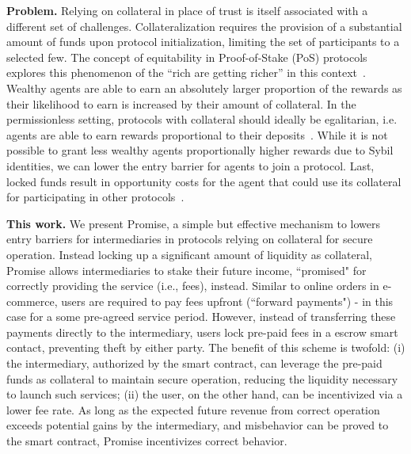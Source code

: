 \documentclass[runningheads]{llncs}
\newcommand{\sys}{Promise\xspace}
\newcommand{\aza}[1]{\todo[linecolor=blue,backgroundcolor=blue!25,bordercolor=blue,inline,caption={}]{Comment by Alexei: #1}}
\begin{document}
\noindent\textbf{Problem.}
Relying on collateral in place of trust is itself associated with a different set of challenges. 
Collateralization requires the provision of a substantial amount of funds upon protocol initialization, limiting the set of participants to a selected few.
The concept of equitability in Proof-of-Stake (PoS) protocols explores this phenomenon of the ``rich are getting richer'' in this context~\cite{Fanti2019Compounding}.
Wealthy agents are able to earn an absolutely larger proportion of the rewards as their likelihood to earn is increased by their amount of collateral.
In the permissionless setting, protocols with collateral should ideally be egalitarian, i.e. agents are able to earn rewards proportional to their deposits~\cite{Karakostas2019Egalitarianism}.
While it is not possible to grant less wealthy agents proportionally higher rewards due to Sybil identities, we can lower the entry barrier for agents to join a protocol.
Last, locked funds result in opportunity costs for the agent that could use its collateral for participating in other protocols~\cite{Harz2019Balance}.

\noindent\textbf{This work.}
We present \sys, a simple but effective mechanism to lowers entry barriers for intermediaries in protocols relying on collateral for secure operation.
Instead locking up a significant amount of liquidity as collateral, \sys allows intermediaries to stake their future income, ``promised" for correctly providing the service (i.e., fees), instead.
Similar to online orders in e-commerce, users are required to pay fees upfront (``forward payments") - in this case for a some pre-agreed service period.
However, instead of transferring these payments directly to the intermediary, users lock pre-paid fees in a escrow smart contact, preventing theft by either party. 
The benefit of this scheme is twofold: (i) the intermediary, authorized by the smart contract, can leverage the pre-paid funds as collateral to maintain secure operation, reducing the liquidity necessary to launch such services; (ii) the user, on the other hand, can be incentivized via a lower fee rate.
As long as the expected future revenue from correct operation exceeds potential gains by the intermediary, and misbehavior can be proved to the smart contract, \sys incentivizes correct behavior.
\end{document}
